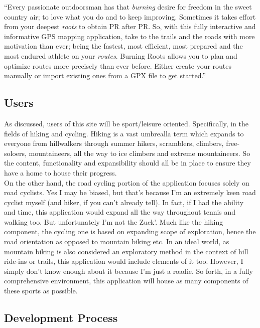 \documentclass[11pt, english]{article}
\begin{document}
	``Every passionate outdoorsman has that \textit{burning} desire for freedom in the sweet country air; to love what you do and to keep improving. Sometimes it takes effort from your deepest \textit{roots} to obtain PR after PR. So, with this fully interactive and informative GPS mapping application, take to the trails and the roads with more motivation than ever; being the fastest, most efficient, most prepared and the most endured athlete on your \textit{routes}. Burning Roots allows you to plan and optimize routes more precisely than ever before. Either create your routes manually or import existing ones from a GPX file to get started.''

	\subsection{Users}

	As discussed, users of this site will be sport/leisure oriented. Specifically, in the fields of hiking and cycling. Hiking is a vast umbrealla term which expands to everyone from hillwalkers through summer hikers, scramblers, climbers, free-soloers, mountaineers, all the way to ice climbers and extreme mountaineers. So the content, functionality and expansibility should all be in place to ensure they have a home to house their progress.\\

	On the other hand, the road cycling portion of the application focuses solely on road cyclists. Yes I may be biased, but that's because I'm an extremely keen road cyclist myself (and hiker, if you can't already tell). In fact, if I had the ability and time, this application would expand all the way throughout tennis and walking too. But unfortunately I'm not the Zuck'. Much like the hiking component, the cycling one is based on expanding scope of exploration, hence the road orientation as opposed to mountain biking etc. In an ideal world, as mountain biking is also considered an exploratory method in the context of hill ride-ins or trails, this application would include elements of it too. However, I simply don't know enough about it because I'm just a roadie. So forth, in a fully comprehensive environment, this application will house as many components of these sports as possible.

	\subsection{Development Process}
\end{document}
